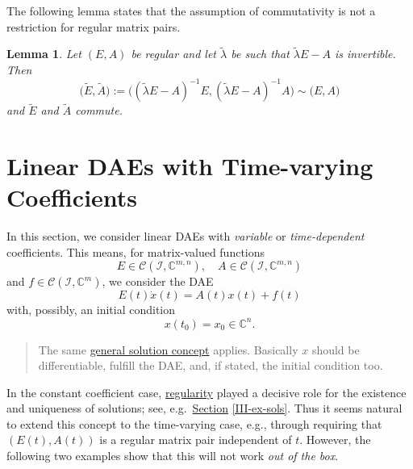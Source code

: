 \documentclass[]{book}
\newenvironment {JHSAYS} [0] {\begin{quote}\color{jhsc}} {\end{quote}}
\newtheorem{lemma}{Lemma}[chapter]
\theoremstyle{definition}
\theoremstyle{definition}
\theoremstyle{definition}
\theoremstyle{definition}
\theoremstyle{remark}
\begin{document}
The following lemma states that the assumption of commutativity is not a restriction for regular matrix pairs.

\begin{lemma}
\protect\hypertarget{lem:regular-ea-commute}{}{\label{lem:regular-ea-commute} }Let \((E,A)\) be regular and let \(\tilde \lambda\) be such that \(\tilde \lambda E - A\) is invertible. Then
\[\bigl (\tilde E,\tilde A\bigr ):=\bigl ( (\tilde \lambda E-A)^{-1}E, (\tilde \lambda E-A)^{-1}A \bigr )  \sim \bigl (E,A \bigr )\]
and \(\tilde E\) and \(\tilde A\) commute.
\end{lemma}

\newcommand{\kernel}{\operatorname{kernel}}
\newcommand{\corange}{\operatorname{corange}}
\newcommand{\corank}{\operatorname{corank}}
\newcommand{\range}{\operatorname{range}}
\newcommand{\cokernel}{\operatorname{cokernel}}

\hypertarget{IV}{%
\chapter{Linear DAEs with Time-varying Coefficients}\label{IV}}

In this section, we consider linear DAEs with \emph{variable} or \emph{time-dependent} coefficients. This means, for matrix-valued functions
\[
E \in \mathcal C(\mathcal I, \mathbb C^{m,n}), \quad A\in \mathcal C(\mathcal I, \mathbb C^{m,n})
\]
and \(f\in \mathcal C(\mathcal I, \mathbb C^{m})\), we consider the DAE
\begin{equation}
E(t)\dot x(t) = A(t)x(t) + f(t) \label{eq:iv-ltv-dae}
\end{equation}
with, possibly, an initial condition
\begin{equation}
x(t_0) = x_0 \in \mathbb C^{n}. \label{eq:iv-ltv-inicond}
\end{equation}

\begin{JHSAYS}
The same \protect\hyperlink{def:dae-solution}{general solution concept} applies. Basically \(x\) should be differentiable, fulfill the DAE, and, if stated, the initial condition too.
\end{JHSAYS}

In the constant coefficient case, \href{III.html/\#def:regularity}{regularity} played a decisive role for the existence and uniqueness of solutions; see, e.g.~\protect\hyperlink{III-ex-sols}{Section} \ref{III-ex-sols}. Thus it seems natural to extend this concept to the time-varying case, e.g., through requiring that \((E(t), A(t))\) is a regular matrix pair independent of \(t\). However, the following two examples show that this will not work \emph{out of the box}.
\end{document}
